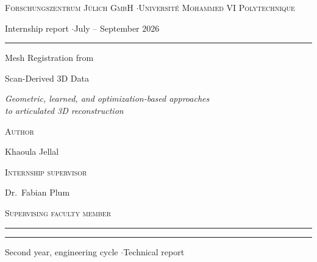 \begin{titlepage}
\thispagestyle{empty}
\raggedright
\vspace*{0.08\textheight}

{\footnotesize\scshape\color{graphite}
Forschungszentrum Jülich GmbH \quad$\cdot$\quad Université Mohammed VI Polytechnique\par
Internship report \quad$\cdot$\quad July -- September 2026\par}

\vspace{0.8\baselineskip}
\textcolor{rule}{\rule{\linewidth}{0.5pt}}
\vspace{2.0\baselineskip}

{\displayfont\fontsize{30}{34}\selectfont
Mesh Registration from\par
Scan-Derived 3D Data\par}

\vspace{0.8\baselineskip}
{\large\color{graphite}\itshape
Geometric, learned, and optimization-based approaches\\
to articulated {3D} reconstruction\par}

\vspace{2.8\baselineskip}
{\footnotesize\scshape\color{graphite}Author\par}
{\large Khaoula Jellal\par}

\vspace{1.0\baselineskip}
{\footnotesize\scshape\color{graphite}Internship supervisor\par}
{\large Dr.\ Fabian Plum\par}

\vspace{1.0\baselineskip}
{\footnotesize\scshape\color{graphite}Supervising faculty member\par}
{\large \rule{0.42\linewidth}{0.4pt}\par}

\vfill
\textcolor{rule}{\rule{\linewidth}{0.5pt}}
\vspace{0.5\baselineskip}
{\footnotesize\color{graphite}
Second year, engineering cycle \quad$\cdot$\quad Technical report\par}
\end{titlepage}
